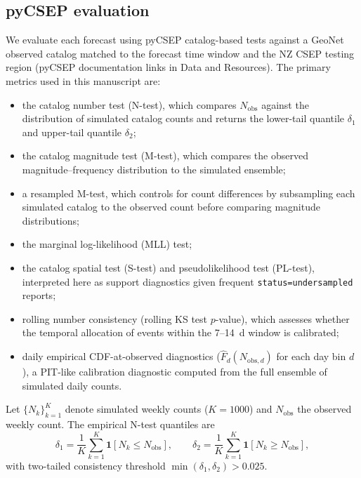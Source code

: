 \documentclass[12pt,letterpaper]{article}
\begin{document}
\subsection{pyCSEP evaluation}

We evaluate each forecast using pyCSEP catalog-based tests against a GeoNet
observed catalog matched to the forecast time window and the NZ CSEP testing
region (pyCSEP documentation links in Data and Resources). The primary metrics used in
this manuscript are:

\begin{itemize}
    \item the catalog number test (N-test), which compares $N_{\mathrm{obs}}$
          against the distribution of simulated catalog counts and returns the
          lower-tail quantile $\delta_1$ and upper-tail quantile $\delta_2$;
    \item the catalog magnitude test (M-test), which compares the
          observed magnitude--frequency distribution to the simulated ensemble;
    \item a resampled M-test, which controls for count differences by
          subsampling each simulated catalog to the observed count before
          comparing magnitude distributions;
    \item the marginal log-likelihood (MLL) test;
    \item the catalog spatial test (S-test) and pseudolikelihood test (PL-test),
          interpreted here as support diagnostics given frequent
          \texttt{status=undersampled} reports;
    \item rolling number consistency (rolling KS test $p$-value), which
          assesses whether the temporal allocation of events within the
          7--14~d window is calibrated;
    \item daily empirical CDF-at-observed diagnostics
          ($\hat{F}_d(N_{\mathrm{obs},d})$ for each day bin $d$), a PIT-like
          calibration diagnostic computed from the full ensemble of simulated
          daily counts.
\end{itemize}

Let $\{N_k\}_{k=1}^K$ denote simulated weekly counts ($K=1000$) and
$N_{\mathrm{obs}}$ the observed weekly count. The empirical N-test quantiles
are
\begin{equation}
\delta_1 = \frac{1}{K}\sum_{k=1}^K \mathbf{1}[N_k \le N_{\mathrm{obs}}],
\qquad
\delta_2 = \frac{1}{K}\sum_{k=1}^K \mathbf{1}[N_k \ge N_{\mathrm{obs}}],
\label{eq:n_test}
\end{equation}
with two-tailed consistency threshold $\min(\delta_1,\delta_2)>0.025$.
\end{document}
